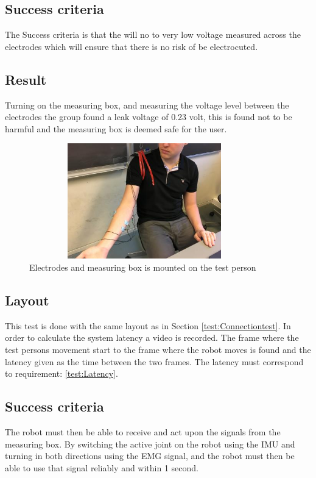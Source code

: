 \subsection*{Success criteria}
 The Success criteria is that the will no to very low voltage measured across the electrodes which will ensure that there is no risk of be electrocuted. 

\subsection*{Result}
  Turning on the measuring box, and measuring the voltage level between the electrodes the group found a leak voltage of 0.23 volt, this is found not to be harmful and the measuring box is deemed safe for the user.   
 
\newpage

\begin{figure}[H]
    \centering
    \includegraphics[width=10cm,height=5cm]{Figures/Technical_figures/image0.jpg}
    \caption{Electrodes and measuring box is mounted on the test person}
    \label{fig:connectiontest}
\end{figure}

\subsection*{Layout}
This test is done with the same layout as in Section \ref{test:Connectiontest}.
In order to calculate the system latency a video is recorded. The frame where the test persons movement start to the frame where the robot moves is found and the latency given as the time between the two frames. The latency must correspond to requirement: \ref{test:Latency}.

\subsection*{Success criteria}
 The robot must then be able to receive and act upon the signals from the measuring box. By switching the active joint on the robot using the IMU and turning in both directions using the EMG signal, and the robot must then be able to use that signal reliably and within 1 second.
